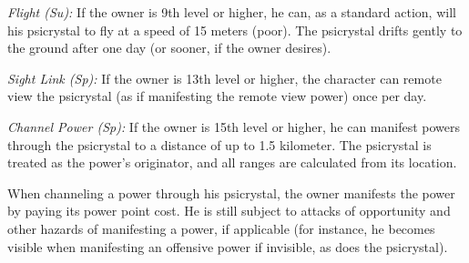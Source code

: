{\textit{Flight (Su):} If the owner is 9th level or higher, he can, as a standard action, will his psicrystal to fly at a speed of 15 meters (poor). The psicrystal drifts gently to the ground after one day (or sooner, if the owner desires).


\textit{Sight Link (Sp):} If the owner is 13th level or higher, the character can remote view the psicrystal (as if manifesting the remote view power) once per day.

\textit{Channel Power (Sp):} If the owner is 15th level or higher, he can manifest powers through the psicrystal to a distance of up to 1.5 kilometer. The psicrystal is treated as the power's originator, and all ranges are calculated from its location.

When channeling a power through his psicrystal, the owner manifests the power by paying its power point cost. He is still subject to attacks of opportunity and other hazards of manifesting a power, if applicable (for instance, he becomes visible when manifesting an offensive power if invisible, as does the psicrystal).


}
